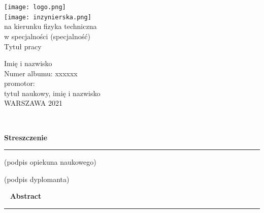 \pagestyle{empty}

\begin{titlepage}
	
\begin{minipage}{\textwidth}
	\begin{center}
		\texttt{[image: logo.png]} \\
			\vspace{3cm}
		\texttt{[image: inzynierska.png]} \\ %
			\vspace{1.5cm}
  			na kierunku fizyka techniczna \\
			w specjalności (specjalność) \\
			\vspace{2cm}	
		{\Large
			Tytuł pracy}

			\vspace{2cm}	
		{\huge
			Imię i nazwisko} \\
			Numer albumu: xxxxxx \\
			\vspace{1.5cm}	
			promotor: \\
			tytuł naukowy, imię i nazwisko \\
			\vspace{3cm}
			WARSZAWA 2021		
	\end{center}
\end{minipage}

\end{titlepage}

\newpage
\mbox{ }

\newpage
{\large \textbf{Streszczenie}}\\
{\color{sliwka}\rule[1pt]{\textwidth}{1.5pt}}




\vspace{2cm}

\begin{multicols}{2}
	\begin{flushleft}
		(podpis opiekuna naukowego)
	\end{flushleft}
	\begin{flushright}
		(podpis dyplomanta)
	\end{flushright}
\end{multicols}

\newpage
\mbox{ }
\newpage
{\large \textbf{Abstract}}\\
{\color{sliwka}\rule[1pt]{\textwidth}{1.5pt}}


